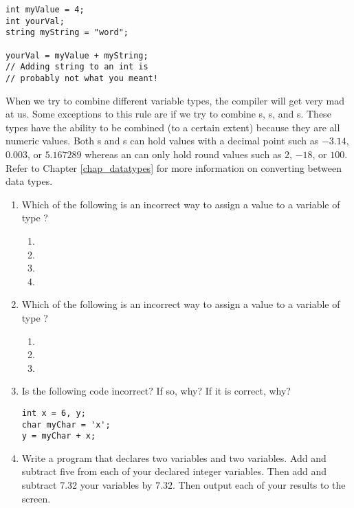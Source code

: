 \noindent\begin{minipage}{\linewidth}\begin{lstlisting}
int myValue = 4;
int yourVal;
string myString = "word";
		
yourVal = myValue + myString; 
// Adding string to an int is
// probably not what you meant!
\end{lstlisting}\end{minipage}

When we try to combine different variable types, the compiler will get very mad at us. 
Some exceptions to this rule are if we try to combine s, s, and s.
These types have the ability to be combined (to a certain extent) because they are all numeric values.
Both s and s can hold values with a decimal point such as $-3.14$, $0.003$, or $5.167289$ whereas an  can only hold round values such as $2$, $-18$, or $100$. 
Refer to Chapter \ref{chap_datatypes} for more information on converting between data types.


\begin{enumerate}
	\item Which of the following is an incorrect way to assign a value to a variable  of type ?
	\begin{enumerate}
	  \item {}
		\item {}
		\item {}
		\item {}
	\end{enumerate}

	\item Which of the following is an incorrect way to assign a value to a variable of type ?
	\begin{enumerate}
		\item {}
		\item {}
		\item {}
	\end{enumerate}

 \item Is the following code incorrect? If so, why? If it is correct, why?

\noindent\begin{minipage}{\linewidth}\begin{lstlisting}
int x = 6, y;
char myChar = 'x';
y = myChar + x;
\end{lstlisting}\end{minipage}

  \item Write a program that declares two  variables and two  variables. 
  Add and subtract five from each of your declared integer variables. 
  Then add and subtract 7.32 your  variables by $7.32$. 
  Then output each of your results to the screen. 
\end{enumerate}

